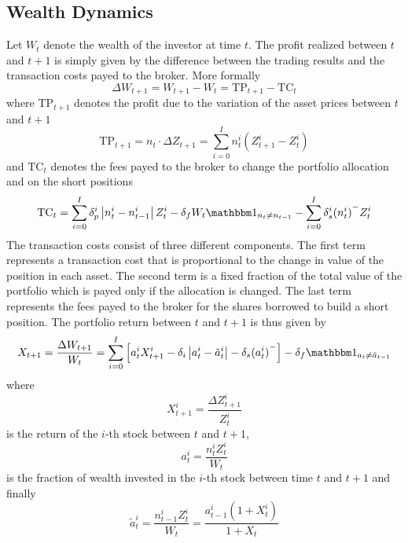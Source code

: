 \subsection{Wealth Dynamics}
Let $W_t$ denote the wealth of the investor at time $t$. The profit realized between $t$ and $t+1$ is simply given by the difference between the trading results and the transaction costs payed to the broker. More formally
\begin{equation*}
	\Delta W_{t+1} = W_{t+1} - W_t = \text{TP}_{t+1} - \text{TC}_{t}	
\end{equation*}
where $\text{TP}_{t+1}$ denotes the profit due to the variation of the asset prices between $t$ and $t+1$
\begin{equation*}
	\text{TP}_{t+1} = {n}_t \cdot \Delta{Z}_{t+1} = \sum^{I}_{i=0} 
	n_t^i (Z_{t+1}^i - Z_t^i) 
\end{equation*}
and $\text{TC}_t$ denotes the fees payed to the broker to change the portfolio allocation and on the short positions
\begin{equation*}
	\text{TC}_t = \sum^{I}_{i=0} \delta_p^i \left| n_t^i - n_{t-1}^i\right| Z_t^i 
				- \delta_f W_t \ind{{n}_t \neq {n}_{t-1}} 
				- \sum^{I}_{i=0} \delta_s^i {(n_t^i)}^{-} Z_t^i
\end{equation*}
The transaction costs consist of three different components. The first term represents a transaction cost that is proportional to the change in value of the position in each asset. The second term is a fixed fraction of the total value of the portfolio which is payed only if the allocation is changed. The last term represents the fees payed to the broker for the shares borrowed to build a short position. The portfolio return between $t$ and $t+1$ is thus given by
\begin{equation}\label{eq:portfolio_return}
	X_{t+1} = \frac{\Delta W_{t+1}}{W_t} = \sum^{I}_{i=0} \left[ a_t^i
	X_{t+1}^i - \delta_i \left| a_t^i - \tilde{a}_t^i \right| - \delta_s
	{(a_t^i)}^- \right] - \delta_f \ind{{a}_t \neq \tilde{{a}}_{t-1}}  
\end{equation}
where 
\begin{equation*}
	X_{t+1}^i = \frac{\Delta Z_{t+1}^i}{Z_t^i}
\end{equation*}
is the return of the $i$-th stock between $t$ and $t+1$, 
\begin{equation*}
	a_t^i = \frac{n_t^i Z_t^i}{W_t}
\end{equation*}
is the fraction of wealth invested in the $i$-th stock between time $t$ and
$t+1$ and finally 
\begin{equation*}
	\tilde{a}_t^i = \frac{n_{t-1}^i Z_t^i}{W_t} = \frac{a_{t-1}^i (1+X_t^i)}
	{1 + X_t}
\end{equation*}
